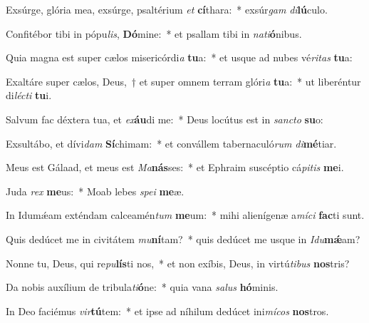 \item Exsúrge, glória mea, exsúrge, psaltérium \textit{et} \textbf{cí}thara:~* exsúr\textit{gam} \textit{di}\textbf{lú}culo.
\item Confitébor tibi in pópu\textit{lis}, \textbf{Dó}mine:~* et psallam tibi in \textit{na}\textit{ti}\textbf{ó}nibus.
\item Quia magna est super cælos misericórdi\textit{a} \textbf{tu}a:~* et usque ad nubes vé\textit{ri}\textit{tas} \textbf{tu}a:
\item Exaltáre super cælos, Deus,~† et super omnem terram glóri\textit{a} \textbf{tu}a:~* ut liberéntur di\textit{léc}\textit{ti} \textbf{tu}i.
\item Salvum fac déxtera tua, et \textit{ex}\textbf{áu}di me:~* Deus locútus est in \textit{sanc}\textit{to} \textbf{su}o:
\item Exsultábo, et dívi\textit{dam} \textbf{Sí}chimam:~* et convállem tabernaculó\textit{rum} \textit{di}\textbf{mé}tiar.
\item Meus est Gálaad, et meus est \textit{Ma}\textbf{nás}ses:~* et Ephraim suscéptio cá\textit{pi}\textit{tis} \textbf{me}i.
\item Juda \textit{rex} \textbf{me}us:~* Moab lebes \textit{spe}\textit{i} \textbf{me}æ.
\item In Idumǽam exténdam calceamén\textit{tum} \textbf{me}um:~* mihi alienígenæ a\textit{mí}\textit{ci} \textbf{fac}ti sunt.
\item Quis dedúcet me in civitátem \textit{mu}\textbf{ní}tam?~* quis dedúcet me usque in \textit{I}\textit{du}\textbf{mǽ}am?
\item Nonne tu, Deus, qui re\textit{pu}\textbf{lís}ti nos,~* et non exíbis, Deus, in virtú\textit{ti}\textit{bus} \textbf{nos}tris?
\item Da nobis auxílium de tribula\textit{ti}\textbf{ó}ne:~* quia vana \textit{sa}\textit{lus} \textbf{hó}minis.
\item In Deo faciémus \textit{vir}\textbf{tú}tem:~* et ipse ad níhilum dedúcet ini\textit{mí}\textit{cos} \textbf{nos}tros.
